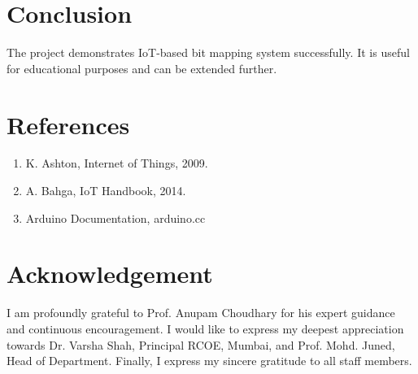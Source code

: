 \documentclass[12pt,a4paper,twoside]{report}
\begin{document}
	\chapter{Conclusion}
	
	The project demonstrates IoT-based bit mapping system successfully. It is useful for educational purposes and can be extended further.
	
	\chapter*{References}
	
	\begin{enumerate}
		\item K. Ashton, Internet of Things, 2009.
		\item A. Bahga, IoT Handbook, 2014.
		\item Arduino Documentation, arduino.cc
	\end{enumerate}
	
	\chapter*{Acknowledgement}
	
	I am profoundly grateful to Prof. Anupam Choudhary for his expert guidance and continuous encouragement.  
	I would like to express my deepest appreciation towards Dr. Varsha Shah, Principal RCOE, Mumbai, and Prof. Mohd. Juned, Head of Department.  
	Finally, I express my sincere gratitude to all staff members.
	
\end{document}
